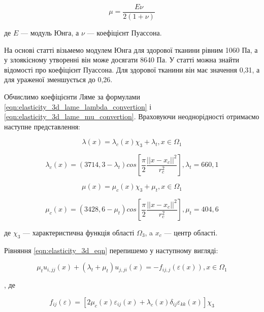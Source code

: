 \begin{equation}
    \label{eqn:elasticity_3d_lame_mu_convertion}
    \mu = \frac{E\nu}{2(1+\nu)}
\end{equation}

\noindent де $E$ --- модуль Юнга, а $\nu$ --- коефіцієнт Пуассона.  

На основі статті \cite{elast-young-modulus-cancer} візьмемо модулем Юнга для здорової тканини рівним 1060 Па, а у 
злоякісному утворенні він може досягати 8640 Па. У статті \cite{elast-poisson-rato-cancer} можна знайти відомості про 
коефіцієнт Пуассона. Для здорової тканини він має значення 0,31, а для ураженої зменшується до 0,26. 

Обчислимо коефіцієнти Ляме за формулами \ref{eqn:elasticity_3d_lame_lambda_convertion} і 
\ref{eqn:elasticity_3d_lame_mu_convertion}. Враховуючи неоднорідності отримаємо наступне представлення:

\begin{equation}
    \label{eqn:elasticity_3d_lyame_lambda}
    \lambda(x) = \lambda_c(x)\chi_3 + \lambda_t, x \in \Omega_1
\end{equation}

\begin{equation*}
    \lambda_c(x) = (3714,3 - \lambda_t)cos\left[\frac{\pi}{2}\frac{||x-x_c||^2}{r_c^2}\right], \lambda_t = 660,1
\end{equation*}

\begin{equation}
    \label{eqn:elasticity_3d_lyame_mu}
    \mu(x) = \mu_c(x)\chi_3 + \mu_t, x \in \Omega_1
\end{equation}

\begin{equation*}
    \mu_c(x) = (3428,6 - \mu_t)cos\left[\frac{\pi}{2}\frac{||x-x_c||^2}{r_c^2}\right], \mu_t = 404,6
\end{equation*}

\noindent де $\chi_3$ --- характеристична функція області $\Omega_3$, a $x_c$ --- центр області.

Рівняння \ref{eqn:elasticity_3d_eqn} перепишемо у наступному вигляді:

\begin{equation}
    \label{eqn:elasticity_3d_eqn_with_f}
    \mu_t u_{i,jj}(x) + (\lambda_t + \mu_t)u_{j,ji}(x) = -f_{ij,j}(\varepsilon(x)), x \in \Omega_1
\end{equation}

\noindent, де

\begin{equation*}
    f_{ij}(\varepsilon) = [ 2\mu_c(x)\varepsilon_{ij}(x) + \lambda_c(x) \delta_{ij} \varepsilon_{kk}(x) ] \chi_3
\end{equation*}


